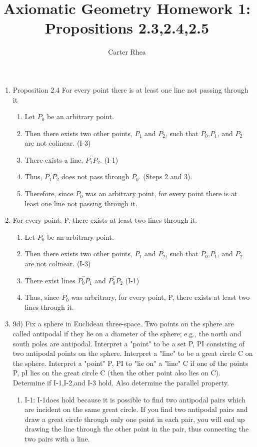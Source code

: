\documentclass[10pt,a4paper]{article}
\author{Carter Rhea}
\title{Axiomatic Geometry Homework 1: Propositions 2.3,2.4,2.5}
\begin{document}
\maketitle
\begin{enumerate}



\item Proposition 2.4 For every point there is at least one line not passing through it
\begin{enumerate}
\item Let $P_0$ be an arbitrary point.
\item Then there exists two other points, $P_1$ and $P_2$, such that $P_0$,$P_1$, and $P_2$ are not colinear. (I-3)
\item There exists a line, $\overleftrightarrow{P_1 P_2}$. (I-1)
\item Thus, $\overleftrightarrow{P_1 P_2}$ does not pass through $P_0$. (Steps 2 and 3).
\item Therefore, since $P_0$ was an arbitrary point, for every point there is at least one line not passing through it.
\end{enumerate}
\item For every point, P, there exists at least two lines through it.
\begin{enumerate}
\item Let $P_0$ be an arbitrary point.
\item Then there exists two other points, $P_1$ and $P_2$, such that $P_0$,$P_1$, and $P_2$ are not colinear. (I-3)
\item There exist lines $\overleftrightarrow{P_0 P_1}$ and $\overleftrightarrow{P_0 P_2}$ (I-1)
\item Thus, since $P_0$ was arbritrary, for every point, P, there exists at least two lines through it.
\end{enumerate}
\item 9d) Fix a sphere in Euclidean three-space. Two points on the sphere
are called antipodal if they lie on a diameter of the sphere; e.g., the
north and south poles are antipodal. Interpret a "point" to be a set
{P, PI} consisting of two antipodal points on the sphere. Interpret
a "line" to be a great circle C on the sphere. Interpret a "point"
{P, PI} to "lie on" a "line" C if one of the points P, pI lies on the
great circle C (then the other point also lies on C).
 Determine if I-1,I-2,and I-3 hold. Also determine the parallel property.
\begin{enumerate}
\item I-1: I-1does hold because it is possible to find two antipodal pairs which are  incident on the same great circle. If you find two antipodal pairs and draw a great circle through only one point in each pair, you will end up drawing the line through the other point in the pair, thus connecting the two pairs with a line.

\end{enumerate}
\end{enumerate}
\end{document}
